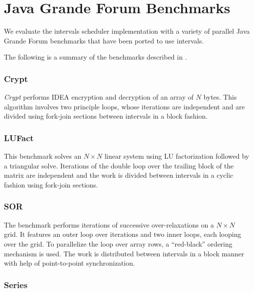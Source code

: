 
\chapter{Java Grande Forum Benchmarks}
\label{chap:benchmarks}

We evaluate the intervals scheduler implementation with a variety of
parallel Java Grande Forum benchmarks \cite{Smith2001, Mathew1999,
  Gregg2003} that have been ported to use intervals.

The following is a summary of the benchmarks described in
\cite{Smith2001, Mathew1999, Gregg2003}.

\subsection*{Crypt}

\emph{Crypt} performs IDEA encryption and decryption of an array of
$N$ bytes. This algorithm involves two principle loops, whose
iterations are independent and are divided using fork-join sections
between intervals in a block fashion.

\subsection*{LUFact}

This benchmark solves an $N \times N$ linear system using LU
factorization followed by a triangular solve. Iterations of the double
loop over the trailing block of the matrix are independent and the
work is divided between intervals in a cyclic fashion using fork-join
sections.

\subsection*{SOR}

The benchmark performs iterations of successive over-relaxations on a
$N \times N$ grid. It features an outer loop over iterations and two
inner loops, each looping over the grid. To parallelize the loop over
array rows, a ``red-black'' ordering mechanism is used. The work is
distributed between intervals in a block manner with help of
point-to-point synchronization.

\subsection*{Series}

